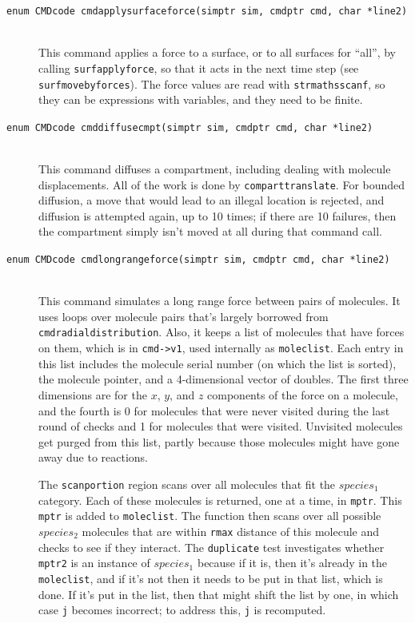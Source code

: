 \documentclass {scrbook}
\newcommand {\ttt} {\texttt}
\begin{document}
\begin{description}
\item[\ttt{enum CMDcode cmdapplysurfaceforce(simptr sim, cmdptr cmd, char *line2)}]
\hfill \\
This command applies a force to a surface, or to all surfaces for ``all'', by calling \ttt{surfapplyforce}, so that it acts in the next time step (see \ttt{surfmovebyforces}). The force values are read with \ttt{strmathsscanf}, so they can be expressions with variables, and they need to be finite.

\item[\ttt{enum CMDcode cmddiffusecmpt(simptr sim, cmdptr cmd, char *line2)}]
\hfill \\
This command diffuses a compartment, including dealing with molecule displacements. All of the work is done by \ttt{comparttranslate}. For bounded diffusion, a move that would lead to an illegal location is rejected, and diffusion is attempted again, up to 10 times; if there are 10 failures, then the compartment simply isn't moved at all during that command call.

\item[\ttt{enum CMDcode cmdlongrangeforce(simptr sim, cmdptr cmd, char *line2)}]
\hfill \\
This command simulates a long range force between pairs of molecules. It uses loops over molecule pairs that's largely borrowed from \ttt{cmdradialdistribution}. Also, it keeps a list of molecules that have forces on them, which is in \ttt{cmd->v1}, used internally as \ttt{moleclist}. Each entry in this list includes the molecule serial number (on which the list is sorted), the molecule pointer, and a 4-dimensional vector of doubles. The first three dimensions are for the $x$, $y$, and $z$ components of the force on a molecule, and the fourth is 0 for molecules that were never visited during the last round of checks and 1 for molecules that were visited. Unvisited molecules get purged from this list, partly because those molecules might have gone away due to reactions.

The \ttt{scanportion} region scans over all molecules that fit the $species_1$ category. Each of these molecules is returned, one at a time, in \ttt{mptr}. This \ttt{mptr} is added to \ttt{moleclist}. The function then scans over all possible $species_2$ molecules that are within \ttt{rmax} distance of this molecule and checks to see if they interact. The \ttt{duplicate} test investigates whether \ttt{mptr2} is an instance of $species_1$ because if it is, then it's already in the \ttt{moleclist}, and if it's not then it needs to be put in that list, which is done. If it's put in the list, then that might shift the list by one, in which case \ttt{j} becomes incorrect; to address this, \ttt{j} is recomputed.


\end{description}
\end{document}
